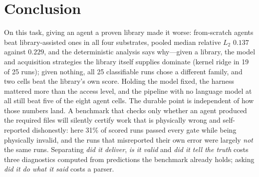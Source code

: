 \section{Conclusion}
\label{sec:conclusion}

On this task, giving an agent a proven library made it worse: from-scratch
agents beat library-assisted ones in all four substrates, pooled median relative
$L_2$ $0.137$ against $0.229$, and the deterministic analysis says why---given a
library, the model and acquisition strategies the library itself supplies
dominate (kernel ridge in 19 of 25 runs); given nothing, all 25 classifiable
runs chose a different family, and two cells beat the library's own score. Holding the model fixed, the
harness mattered more than the access level, and the pipeline with no language
model at all still beat five of the eight agent cells. The durable point is
independent of how those numbers land. A benchmark that checks only whether an
agent produced the required files will silently certify work that is physically
wrong and self-reported dishonestly: here 31\% of scored runs passed every gate
while being physically invalid, and the runs that misreported their own error
were largely \emph{not} the same runs. Separating \emph{did it deliver},
\emph{is it valid} and \emph{did it tell the truth} costs three diagnostics
computed from predictions the benchmark already holds; asking \emph{did it do
what it said} costs a parser.
